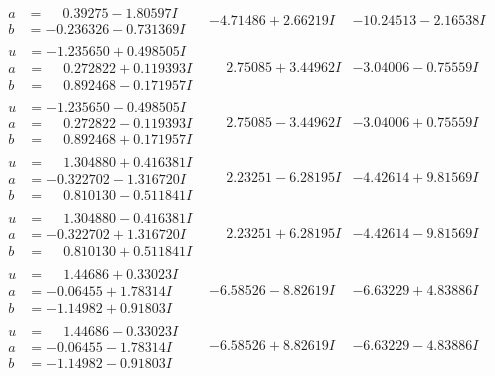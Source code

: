 \documentclass[1p]{elsarticle_modified}
\theoremstyle{definition}
\begin{document}
$$\begin{array}{c|c|c}
\begin{aligned}
a &= \phantom{-}0.39275 - 1.80597 I \\
b &= -0.236326 - 0.731369 I\end{aligned}
 & -4.71486 + 2.66219 I & -10.24513 - 2.16538 I \\ \hline\begin{aligned}
u &= -1.235650 + 0.498505 I \\
a &= \phantom{-}0.272822 + 0.119393 I \\
b &= \phantom{-}0.892468 - 0.171957 I\end{aligned}
 & \phantom{-}2.75085 + 3.44962 I & -3.04006 - 0.75559 I \\ \hline\begin{aligned}
u &= -1.235650 - 0.498505 I \\
a &= \phantom{-}0.272822 - 0.119393 I \\
b &= \phantom{-}0.892468 + 0.171957 I\end{aligned}
 & \phantom{-}2.75085 - 3.44962 I & -3.04006 + 0.75559 I \\ \hline\begin{aligned}
u &= \phantom{-}1.304880 + 0.416381 I \\
a &= -0.322702 - 1.316720 I \\
b &= \phantom{-}0.810130 - 0.511841 I\end{aligned}
 & \phantom{-}2.23251 - 6.28195 I & -4.42614 + 9.81569 I \\ \hline\begin{aligned}
u &= \phantom{-}1.304880 - 0.416381 I \\
a &= -0.322702 + 1.316720 I \\
b &= \phantom{-}0.810130 + 0.511841 I\end{aligned}
 & \phantom{-}2.23251 + 6.28195 I & -4.42614 - 9.81569 I \\ \hline\begin{aligned}
u &= \phantom{-}1.44686 + 0.33023 I \\
a &= -0.06455 + 1.78314 I \\
b &= -1.14982 + 0.91803 I\end{aligned}
 & -6.58526 - 8.82619 I & -6.63229 + 4.83886 I \\ \hline\begin{aligned}
u &= \phantom{-}1.44686 - 0.33023 I \\
a &= -0.06455 - 1.78314 I \\
b &= -1.14982 - 0.91803 I\end{aligned}
 & -6.58526 + 8.82619 I & -6.63229 - 4.83886 I \\ \hline\begin{aligned}

\end{aligned}
\end{array}$$
\end{document}
